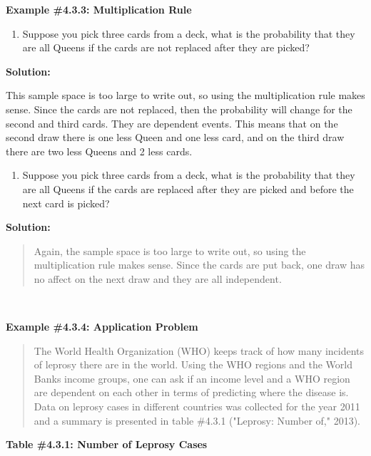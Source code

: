 \documentclass[]{book}
\providecommand{\tightlist}{%
  \setlength{\itemsep}{0pt}\setlength{\parskip}{0pt}}
\begin{document}
\textbf{Example \#4.3.3: Multiplication Rule}

\begin{enumerate}
\def\labelenumi{\alph{enumi}.}
\tightlist
\item
  Suppose you pick three cards from a deck, what is the probability
  that they are all Queens if the cards are not replaced after they
  are picked?
\end{enumerate}

\textbf{Solution:}

This sample space is too large to write out, so using the
multiplication rule makes sense. Since the cards are not replaced,
then the probability will change for the second and third cards.
They are dependent events. This means that on the second draw there
is one less Queen and one less card, and on the third draw there are
two less Queens and 2 less cards.

\begin{enumerate}
\def\labelenumi{\alph{enumi}.}
\setcounter{enumi}{1}
\tightlist
\item
  Suppose you pick three cards from a deck, what is the probability
  that they are all Queens if the cards are replaced after they are
  picked and before the next card is picked?
\end{enumerate}

\textbf{Solution:}

\begin{quote}
Again, the sample space is too large to write out, so using the
multiplication rule makes sense. Since the cards are put back, one
draw has no affect on the next draw and they are all independent.
\end{quote}

\textbf{\\
}

\textbf{Example \#4.3.4: Application Problem}

\begin{quote}
The World Health Organization (WHO) keeps track of how many incidents
of leprosy there are in the world. Using the WHO regions and the World
Banks income groups, one can ask if an income level and a WHO region
are dependent on each other in terms of predicting where the disease
is. Data on leprosy cases in different countries was collected for the
year 2011 and a summary is presented in table \#4.3.1 ("Leprosy:
Number of," 2013).
\end{quote}

\textbf{Table \#4.3.1: Number of Leprosy Cases}
\end{document}

